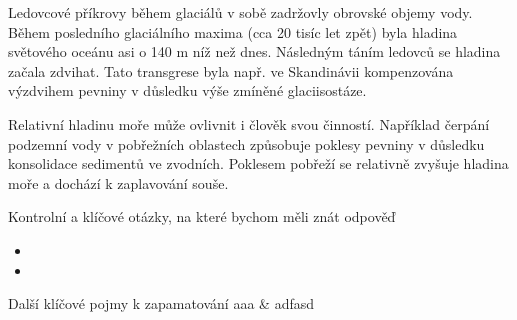 Ledovcové příkrovy během glaciálů v sobě zadržovly obrovské objemy vody. Během posledního glaciálního maxima (cca 20 tisíc let zpět) byla hladina světového oceánu asi o 140 m níž než dnes. Následným táním ledovců se hladina začala zdvihat. Tato transgrese byla např. ve Skandinávii kompenzována výzdvihem pevniny v důsledku výše zmíněné glaciisostáze.

Relativní hladinu moře může ovlivnit i člověk svou činností. Například čerpání podzemní vody v pobřežních oblastech způsobuje poklesy pevniny v důsledku konsolidace sedimentů ve zvodních. Poklesem pobřeží se relativně zvyšuje hladina moře a dochází k zaplavování souše.


%




\newpage
\onecolumn
\begin{boxotazky}{Kontrolní a klíčové otázky, na které bychom měli znát odpověď}
	\begin{itemize}
		\item 
		\item 
		
	\end{itemize}
\end{boxotazky}

\begin{boxslovnik}{Další klíčové pojmy k zapamatování}
	aaa & adfasd \\
	
\end{boxslovnik}
\twocolumn







